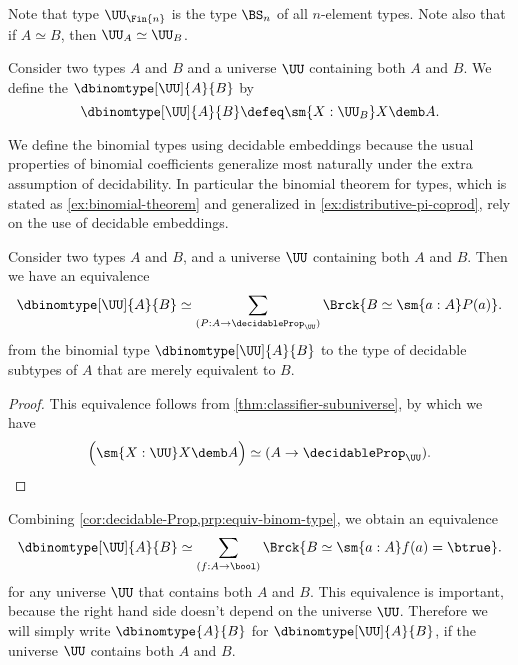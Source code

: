 \begin{eg}
  Note that type $\UU_{\Fin{n}}$ is the type $\BS_n$ of all $n$-element types. Note also that if $A\simeq B$, then $\UU_A\simeq\UU_B$.
\end{eg}

\begin{defn}\label{defn:binomial-type}
  Consider two types $A$ and $B$ and a universe $\UU$ containing both $A$ and $B$. We define the  $\dbinomtype[\UU]{A}{B}$ by
  \begin{equation*}
    \dbinomtype[\UU]{A}{B} \defeq \sm{X:\UU_B}X\demb A.
  \end{equation*}
\end{defn}

\begin{rmk}
  We define the binomial types using decidable embeddings because the usual properties of binomial coefficients generalize most naturally under the extra assumption of decidability. In particular the binomial theorem for types, which is stated as \cref{ex:binomial-theorem} and generalized in \cref{ex:distributive-pi-coprod}, rely on the use of decidable embeddings.
\end{rmk}

\begin{prp}\label{prp:equiv-binom-type}
  Consider two types $A$ and $B$, and a universe $\UU$ containing both $A$ and $B$. Then we have an equivalence
  \begin{equation*}
    \dbinomtype[\UU]{A}{B}\simeq \sum_{(P:A\to\decidableProp_\UU)}\Brck{B\simeq\sm{a:A}P(a)}.
  \end{equation*}
  from the binomial type $\dbinomtype[\UU]{A}{B}$ to the type of decidable subtypes of $A$ that are merely equivalent to $B$.
\end{prp}

\begin{proof}
  This equivalence follows from \cref{thm:classifier-subuniverse}, by which we have
  \begin{equation*}
    \Big(\sm{X:\UU}X\demb A\Big)\simeq (A\to\decidableProp_\UU).\qedhere
  \end{equation*}
\end{proof}

\begin{rmk}
  Combining \cref{cor:decidable-Prop,prp:equiv-binom-type}, we obtain an equivalence
  \begin{equation*}
    \dbinomtype[\UU]{A}{B}\simeq \sum_{(f:A\to\bool)}\Brck{B\simeq\sm{a:A}f(a)=\btrue}.
  \end{equation*}
  for any universe $\UU$ that contains both $A$ and $B$. This equivalence is important, because the right hand side doesn't depend on the universe $\UU$. Therefore we will simply write $\dbinomtype{A}{B}$ for $\dbinomtype[\UU]{A}{B}$, if the universe $\UU$ contains both $A$ and $B$.
\end{rmk}
  
